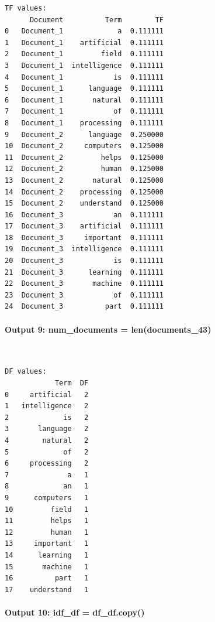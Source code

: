 \documentclass[12pt,a4paper,oneside]{report}
\begin{document}
\begin{Verbatim}[commandchars=\\\{\},breaklines=true,breakanywhere=true,fontsize=\scriptsize,frame=leftline,framesep=2mm,rulecolor=\color{gray}]
TF values:
      Document          Term        TF
0   Document_1             a  0.111111
1   Document_1    artificial  0.111111
2   Document_1         field  0.111111
3   Document_1  intelligence  0.111111
4   Document_1            is  0.111111
5   Document_1      language  0.111111
6   Document_1       natural  0.111111
7   Document_1            of  0.111111
8   Document_1    processing  0.111111
9   Document_2      language  0.250000
10  Document_2     computers  0.125000
11  Document_2         helps  0.125000
12  Document_2         human  0.125000
13  Document_2       natural  0.125000
14  Document_2    processing  0.125000
15  Document_2    understand  0.125000
16  Document_3            an  0.111111
17  Document_3    artificial  0.111111
18  Document_3     important  0.111111
19  Document_3  intelligence  0.111111
20  Document_3            is  0.111111
21  Document_3      learning  0.111111
22  Document_3       machine  0.111111
23  Document_3            of  0.111111
24  Document_3          part  0.111111
\end{Verbatim}
\paragraph{Output 9: num\_documents = len(documents\_43)}\mbox{}\\[-1ex]
\begin{Verbatim}[commandchars=\\\{\},breaklines=true,breakanywhere=true,fontsize=\scriptsize,frame=leftline,framesep=2mm,rulecolor=\color{gray}]
DF values:
            Term  DF
0     artificial   2
1   intelligence   2
2             is   2
3       language   2
4        natural   2
5             of   2
6     processing   2
7              a   1
8             an   1
9      computers   1
10         field   1
11         helps   1
12         human   1
13     important   1
14      learning   1
15       machine   1
16          part   1
17    understand   1
\end{Verbatim}
\paragraph{Output 10: idf\_df = df\_df.copy()}\mbox{}\\[-1ex]
\end{document}
